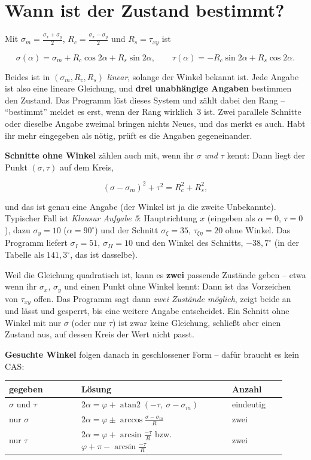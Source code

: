 \section{Wann ist der Zustand bestimmt?}

Mit $\sigma_m = \frac{\sigma_x+\sigma_y}{2}$, $R_c = \frac{\sigma_x-\sigma_y}{2}$ und
$R_s = \tau_{xy}$ ist

\[
  \sigma(\alpha) = \sigma_m + R_c\cos 2\alpha + R_s\sin 2\alpha, \qquad
  \tau(\alpha) = -R_c\sin 2\alpha + R_s\cos 2\alpha .
\]

Beides ist in $(\sigma_m, R_c, R_s)$ \emph{linear}, solange der Winkel bekannt ist. Jede Angabe
ist also eine lineare Gleichung, und \textbf{drei unabhängige Angaben} bestimmen den Zustand.
Das Programm löst dieses System und zählt dabei den Rang -- \enquote{bestimmt} meldet es erst,
wenn der Rang wirklich~3 ist. Zwei parallele Schnitte oder dieselbe Angabe zweimal bringen
nichts Neues, und das merkt es auch. Habt ihr mehr eingegeben als nötig, prüft es die Angaben
gegeneinander.

\textbf{Schnitte ohne Winkel} zählen auch mit, wenn ihr $\sigma$ \emph{und} $\tau$ kennt: Dann
liegt der Punkt $(\sigma, \tau)$ auf dem Kreis,

\[
  (\sigma - \sigma_m)^2 + \tau^2 = R_c^2 + R_s^2 ,
\]

und das ist genau eine Angabe (der Winkel ist ja die zweite Unbekannte). Typischer Fall ist
\emph{Klausur Aufgabe 5}: Hauptrichtung $x$ (eingeben als $\alpha = 0$, $\tau = 0$), dazu
$\sigma_y = 10$ ($\alpha = 90^\circ$) und der Schnitt $\sigma_\xi = 35$, $\tau_{\xi\eta} = 20$ ohne
Winkel. Das Programm liefert $\sigma_I = 51$, $\sigma_{II} = 10$ und den Winkel des Schnitts,
$-38{,}7^\circ$ (in der Tabelle als $141{,}3^\circ$, das ist dasselbe).

Weil die Gleichung quadratisch ist, kann es \textbf{zwei} passende Zustände geben -- etwa wenn ihr
$\sigma_x$, $\sigma_y$ und einen Punkt ohne Winkel kennt: Dann ist das Vorzeichen von $\tau_{xy}$
offen. Das Programm sagt dann \emph{zwei Zustände möglich}, zeigt beide an und lässt
 und  gesperrt, bis eine weitere Angabe entscheidet. Ein Schnitt ohne Winkel mit
nur $\sigma$ (oder nur $\tau$) ist zwar keine Gleichung, schließt aber einen Zustand aus, auf dessen
Kreis der Wert nicht passt.

\textbf{Gesuchte Winkel} folgen danach in geschlossener Form -- dafür braucht es kein CAS:

\begin{longtable}{p{0.24\linewidth}p{0.50\linewidth}p{0.18\linewidth}}
  \toprule
  \textbf{gegeben} & \textbf{Lösung} & \textbf{Anzahl} \\
  \midrule \endhead
  $\sigma$ und $\tau$ & $2\alpha = \varphi + \operatorname{atan2}(-\tau,\ \sigma-\sigma_m)$ &
    eindeutig \\
  nur $\sigma$ & $2\alpha = \varphi \pm \arccos\frac{\sigma-\sigma_m}{R}$ & zwei \\
  nur $\tau$ & $2\alpha = \varphi + \arcsin\frac{-\tau}{R}$ bzw.\ $\varphi + \pi - \arcsin\frac{-\tau}{R}$ & zwei \\
  \bottomrule
\end{longtable}

